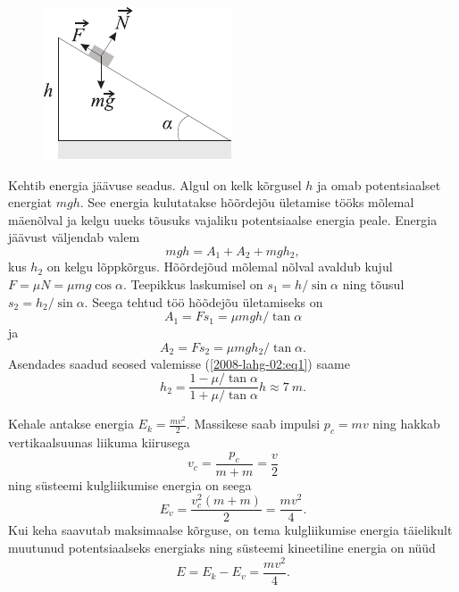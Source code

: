 \documentclass[10pt]{article}
\begin{document}
{
\solu
\begin{figure}
	\begin{center}
		\vspace{-25pt}
		\includegraphics[width=0.95\linewidth]{2008-lahg-02-lah}
	\end{center}
\end{figure}
Kehtib energia jäävuse seadus. Algul on kelk kõrgusel $h$ ja omab potentsiaalset energiat $mgh$. See energia kulutatakse hõõrdejõu ületamise tööks mõlemal mäenõlval ja kelgu uueks tõusuks vajaliku potentsiaalse energia peale. Energia jäävust väljendab valem 
\begin{equation} \label{2008-lahg-02:eq1}
mgh= A_1+ A_2+ mgh_2,
\end{equation}
kus $h_2$ on kelgu lõppkõrgus. Hõõrdejõud mõlemal nõlval avaldub kujul $F=\mu N=\mu mg \cos\alpha$. Teepikkus laskumisel on $s_1= h/ \sin\alpha$ ning tõusul $s_2= h_2/ \sin\alpha$. Seega tehtud töö hõõdejõu ületamiseks on
\[
A_1= F s_1=\mu mgh/\tan\alpha
\]
ja
\[
A_2= F s_2=\mu mgh_2/\tan\alpha.
\]
Asendades saadud seosed valemisse (\ref{2008-lahg-02:eq1}) saame
\[
h_2= \frac{1 - \mu/\tan\alpha}{1 + \mu/\tan\alpha}h \approx \SI{7}{m}.
\]
\probend
\bigskip


\solu
Kehale antakse energia $E_k = \frac{mv^2}{2}$. Massikese saab impulsi $p_c = mv$ ning hakkab vertikaalsuunas liikuma kiirusega
\[
v_{c}=\frac{p_{c}}{m+m}=\frac{v}{2}
\]
ning süsteemi kulgliikumise energia on seega
\[
E_{v}=\frac{v_{c}^{2}(m+m)}{2}=\frac{m v^{2}}{4}.
\]
Kui keha saavutab maksimaalse kõrguse, on tema kulgliikumise energia täielikult muutunud potentsiaalseks energiaks ning süsteemi kineetiline energia on nüüd
\[
E = E_k - E_v = \frac{mv^2}{4}.
\]
\probend
\bigskip

}
\end{document}
